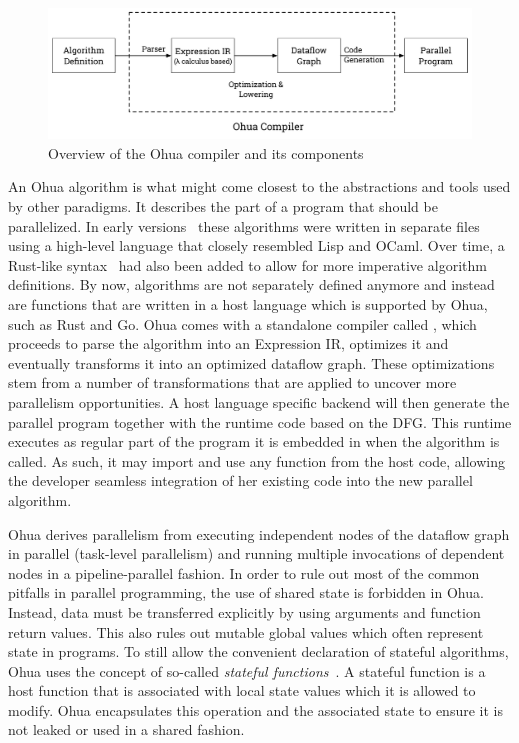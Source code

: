 \begin{figure}[h]
    \includegraphics[width=\textwidth,keepaspectratio]{gfx/background-ohua}
    \caption{Overview of the Ohua compiler and its components}%
    \label{fig:background:ohua}
\end{figure}

An Ohua algorithm is what might come closest to the abstractions and tools used by other paradigms.
It describes the part of a program that should be parallelized.
In early versions~\cite{ertel2015ohua} these algorithms were written in separate files using a high-level language that closely resembled Lisp and OCaml.
Over time, a Rust-like syntax~\cite{adam2019master} had also been added to allow for more imperative algorithm definitions.
By now, algorithms are not separately defined anymore and instead are functions that are written in a host language which is supported by Ohua, such as Rust and Go.
Ohua comes with a standalone compiler called , which proceeds to parse the algorithm into an Expression IR, optimizes it and eventually transforms it into an optimized dataflow graph.
These optimizations stem from a number of transformations that are applied to uncover more parallelism opportunities.
A host language specific backend will then generate the parallel program together with the runtime code based on the DFG.
This runtime executes as regular part of the program it is embedded in when the algorithm is called.
As such, it may import and use any function from the host code, allowing the developer seamless integration of her existing code into the new parallel algorithm.

Ohua derives parallelism from executing independent nodes of the dataflow graph in parallel (task-level parallelism) and running multiple invocations of dependent nodes in a pipeline-parallel fashion.
In order to rule out most of the common pitfalls in parallel programming, the use of shared state is forbidden in Ohua.
Instead, data must be transferred explicitly by using arguments and function return values.
This also rules out mutable global values which often represent state in programs.
To still allow the convenient declaration of stateful algorithms, Ohua uses the concept of so-called \emph{stateful functions}~\cite{ertel2019stclang}.
A stateful function is a host function that is associated with local state values which it is allowed to modify.
Ohua encapsulates this operation and the associated state to ensure it is not leaked or used in a shared fashion.

